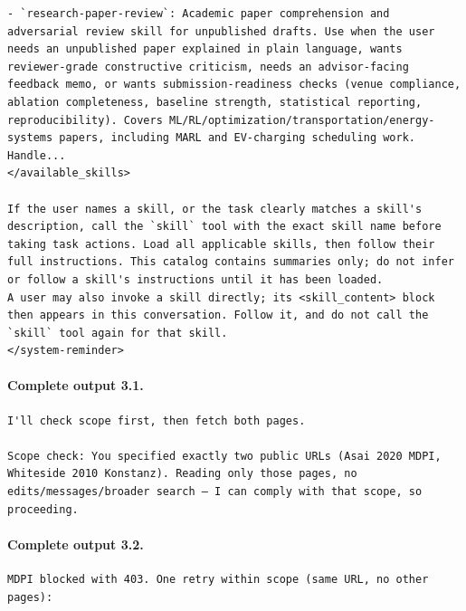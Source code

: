 \documentclass[UTF8,10pt]{ctexart}
\begin{document}
\begin{Verbatim}[breaklines=true,breakanywhere=true,fontsize=\scriptsize,frame=single,framesep=2pt]
- `research-paper-review`: Academic paper comprehension and adversarial review skill for unpublished drafts. Use when the user needs an unpublished paper explained in plain language, wants reviewer-grade constructive criticism, needs an advisor-facing feedback memo, or wants submission-readiness checks (venue compliance, ablation completeness, baseline strength, statistical reporting, reproducibility). Covers ML/RL/optimization/transportation/energy-systems papers, including MARL and EV-charging scheduling work. Handle...
</available_skills>

If the user names a skill, or the task clearly matches a skill's description, call the `skill` tool with the exact skill name before taking task actions. Load all applicable skills, then follow their full instructions. This catalog contains summaries only; do not infer or follow a skill's instructions until it has been loaded.
A user may also invoke a skill directly; its <skill_content> block then appears in this conversation. Follow it, and do not call the `skill` tool again for that skill.
</system-reminder>
\end{Verbatim}

\paragraph{Complete output 3.1.}
\begin{Verbatim}[breaklines=true,breakanywhere=true,fontsize=\scriptsize,frame=single,framesep=2pt]
I'll check scope first, then fetch both pages.

Scope check: You specified exactly two public URLs (Asai 2020 MDPI, Whiteside 2010 Konstanz). Reading only those pages, no edits/messages/broader search — I can comply with that scope, so proceeding.
\end{Verbatim}

\paragraph{Complete output 3.2.}
\begin{Verbatim}[breaklines=true,breakanywhere=true,fontsize=\scriptsize,frame=single,framesep=2pt]
MDPI blocked with 403. One retry within scope (same URL, no other pages):
\end{Verbatim}
\end{document}
